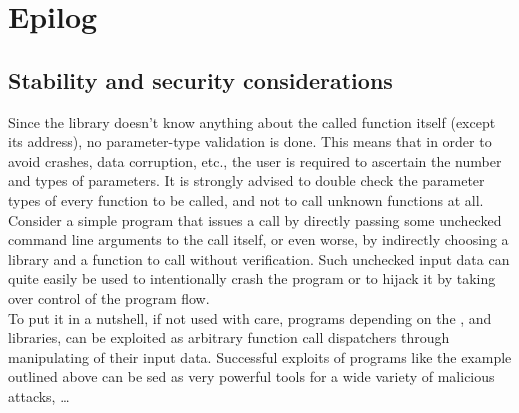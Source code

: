 %
%
%
%

\newpage

\section{Epilog}

\subsection{Stability and security considerations}

Since the  library doesn't know anything about the called
function itself (except its address), no parameter-type validation is done.
This means that in order to avoid crashes, data corruption, etc., the user is
required to ascertain the number and types of parameters. It is strongly advised to
double check the parameter types of every function to be called, and not to
call unknown functions at all.\\

Consider a simple program that issues a call by directly passing some
unchecked command line arguments to the call itself, or even worse, by indirectly
choosing a library and a function to call without verification.
Such unchecked input data can quite easily be used to intentionally crash the
program or to hijack it by taking over control of the program flow.\\
To put it in a nutshell, if not used with care, programs depending on the
,  and  libraries,
can be exploited as arbitrary function call dispatchers through manipulating
of their input data. Successful exploits of programs like the example outlined above
can be sed as very powerful tools for a wide variety of malicious attacks, \ldots
 

